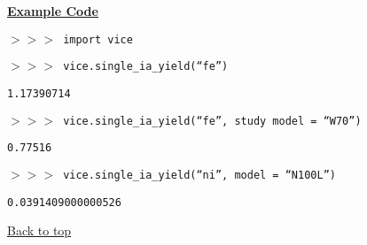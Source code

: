 \documentclass{report}
\begin{document}
\par\null\par\noindent 
\underline{\textbf{Example Code}} 
\par\noindent 
\texttt{$>>>$ import vice} \par\noindent 
\texttt{$>>>$ vice.single\_ia\_yield(``fe'')} \par\noindent 
\texttt{1.17390714} \par\noindent 
\texttt{$>>>$ vice.single\_ia\_yield(``fe'', study 
model = ``W70'')} \par\noindent 
\texttt{0.77516} \par\noindent 
\texttt{$>>>$ vice.single\_ia\_yield(``ni'', model = ``N100L'')} \par\noindent 
\texttt{0.0391409000000526} \par\noindent 

\vfill 
\hyperlink{top}{Back to top}
\clearpage 
\end{document}
